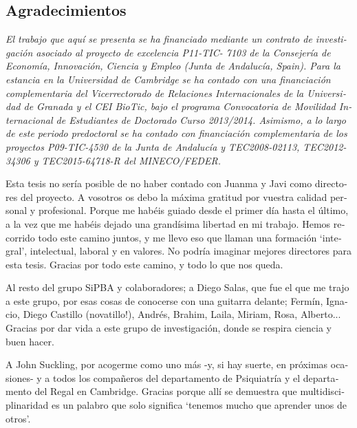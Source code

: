 

\begin{otherlanguage}{spanish}
\chapter*{Agradecimientos}
\textit{El trabajo que aquí se presenta se ha financiado mediante un contrato de investigación asociado al proyecto de excelencia P11-TIC- 7103 de la Consejer\'ia de Econom\'ia, Innovaci\'on, Ciencia y Empleo (Junta de Andaluc\'ia, Spain). Para la estancia en la Universidad de Cambridge se ha contado con una financiación complementaria del Vicerrectorado de Relaciones Internacionales de la Universidad de Granada y el CEI BioTic, bajo el programa Convocatoria de Movilidad Internacional de Estudiantes de Doctorado Curso 2013/2014. Asimismo, a lo largo de este periodo predoctoral se ha contado con financiación complementaria de los proyectos P09-TIC-4530 de la Junta de Andalucía y TEC2008-02113, TEC2012-34306 y TEC2015-64718-R del MINECO/FEDER.}
\bigskip

Esta tesis no sería posible de no haber contado con Juanma y Javi como directores del proyecto. A vosotros os debo la máxima gratitud por vuestra calidad personal y profesional. Porque me habéis guiado desde el primer día hasta el último, a la vez que me habéis dejado una grandísima libertad en mi trabajo. Hemos recorrido todo este camino juntos, y me llevo eso que llaman una formación `integral', intelectual, laboral y en valores. No podría imaginar mejores directores para esta tesis. Gracias por todo este camino, y todo lo que nos queda. 

Al resto del grupo SiPBA y colaboradores; a Diego Salas, que fue el que me trajo a este grupo, por esas cosas de conocerse con una guitarra delante; Fermín, Ignacio, Diego Castillo (novatillo!), Andrés, Brahim, Laila, Miriam, Rosa, Alberto... Gracias por dar vida a este grupo de investigación, donde se respira ciencia y buen hacer. 

A John Suckling, por acogerme como uno más -y, si hay suerte, en próximas ocasiones- y a todos los compañeros del departamento de Psiquiatría y el departamento del Regal en Cambridge. Gracias porque allí se demuestra que multidisciplinaridad es un palabro que solo significa `tenemos mucho que aprender unos de otros'. 


\end{otherlanguage}
